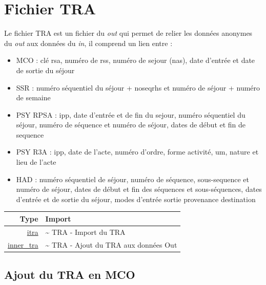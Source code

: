 \documentclass[]{book}
\providecommand{\tightlist}{%
  \setlength{\itemsep}{0pt}\setlength{\parskip}{0pt}}
\begin{document}
\chapter{Fichier TRA}\label{fichier-tra}

Le fichier TRA est un fichier du \emph{out} qui permet de relier les
données anonymes du \emph{out} aux données du \emph{in}, il comprend un
lien entre :

\begin{itemize}
\tightlist
\item
  MCO : clé rsa, numéro de rss, numéro de sejour (nas), date d'entrée et
  date de sortie du séjour
\item
  SSR : numéro séquentiel du séjour + noseqrhs et numéro de séjour +
  numéro de semaine
\item
  PSY RPSA : ipp, date d'entrée et de fin du sejour, numéro séquentiel
  du séjour, numéro de séquence et numéro de séjour, dates de début et
  fin de sequence
\item
  PSY R3A : ipp, date de l'acte, numéro d'ordre, forme activité, um,
  nature et lieu de l'acte
\item
  HAD : numéro séquentiel de séjour, numéro de séquence, sous-sequence
  et numéro de séjour, dates de début et fin des séquences et
  sous-séquences, dates d'entrée et de sortie du séjour, modes d'entrée
  sortie provenance destination
\end{itemize}

\begin{longtable}[]{@{}rl@{}}
\toprule
Type & Import\tabularnewline
\midrule
\endhead
\href{https://github.com/IM-APHP/pmeasyr/tree/master/Rd_md/itra.Rmd}{itra}
& \textasciitilde{} TRA - Import du TRA\tabularnewline
\href{https://github.com/IM-APHP/pmeasyr/tree/master/Rd_md/inner_tra.Rmd}{inner\_tra}
& \textasciitilde{} TRA - Ajout du TRA aux données Out\tabularnewline
\bottomrule
\end{longtable}

\section{Ajout du TRA en MCO}\label{ajout-du-tra-en-mco}
\end{document}
